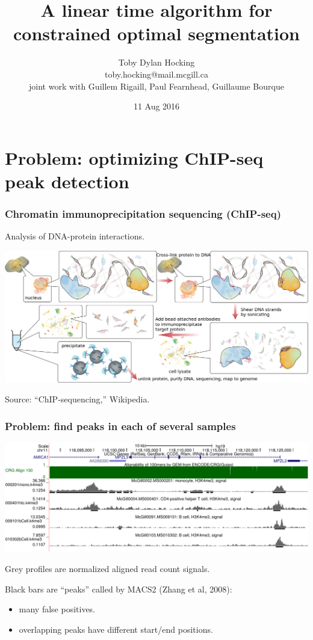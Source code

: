 \documentclass{beamer}
\begin{document}
\title{A linear time algorithm for constrained 
optimal segmentation}

\author{
  Toby Dylan Hocking\\
  toby.hocking@mail.mcgill.ca\\
  joint work with Guillem Rigaill, Paul Fearnhead, 
  Guillaume Bourque}

\date{11 Aug 2016}

\maketitle

\section{Problem: optimizing ChIP-seq peak detection}

\begin{frame}
  \frametitle{Chromatin immunoprecipitation sequencing (ChIP-seq)}
  Analysis of DNA-protein interactions.

  \includegraphics[width=\textwidth]{Chromatin_immunoprecipitation_sequencing_wide.png}

  Source: ``ChIP-sequencing,'' Wikipedia.
\end{frame}

\begin{frame}
  \frametitle{Problem: find peaks in each of several samples}
  \includegraphics[width=\textwidth]{screenshot-ucsc-edited}

  Grey profiles are normalized aligned read count signals.

  Black bars are ``peaks'' called by MACS2 (Zhang et al, 2008):
  \begin{itemize}
  \item many false positives.
  \item overlapping peaks have different start/end positions.
  \end{itemize}
\end{frame}
\end{document}
